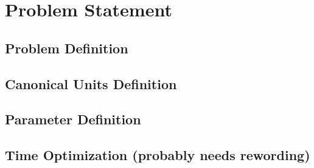 \chapter{Problem Statement}

\section{Problem Definition}
\section{Canonical Units Definition}
\section{Parameter Definition}
\section{Time Optimization (probably needs rewording)}
\newpage
